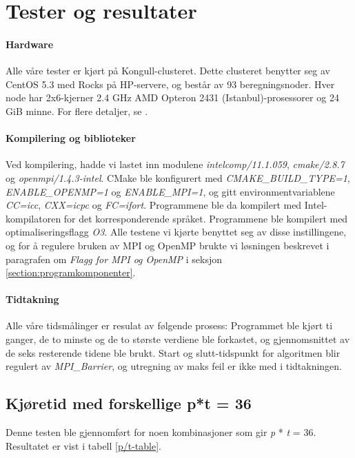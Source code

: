 \documentclass{article}
\begin{document}
\section{Tester og resultater}

\paragraph{Hardware}
Alle våre tester er kjørt på Kongull-clusteret. Dette clusteret benytter seg av CentOS 5.3 med Rocks på HP-servere, og består av 93 beregningsnoder. Hver node har 2x6-kjerner 2.4 GHz AMD Opteron 2431 (Istanbul)-prosessorer og 24 GiB minne. For flere detaljer, se \cite{kongull-hardware}.  

\paragraph{Kompilering og biblioteker}
Ved kompilering, hadde vi lastet inn modulene \emph{intelcomp/11.1.059}, \emph{cmake/2.8.7} og \emph{openmpi/1.4.3-intel}. CMake ble konfigurert med \emph{CMAKE\_BUILD\_TYPE=1}, \emph{ENABLE\_OPENMP=1} og \emph{ENABLE\_MPI=1}, og gitt environmentvariablene \emph{CC=icc}, \emph{CXX=icpc} og \emph{FC=ifort}. Programmene ble da kompilert med Intel-kompilatoren for det korresponderende språket. Programmene ble kompilert med optimaliseringsflagg \emph{O3}. Alle testene vi kjørte benyttet seg av disse instillingene, og for å regulere bruken av MPI og OpenMP brukte vi løsningen beskrevet i paragrafen om \emph{Flagg for MPI og OpenMP} i seksjon \ref{section:programkomponenter}.

\paragraph{Tidtakning}
Alle våre tidsmålinger er resulat av følgende prosess: Programmet ble kjørt ti ganger, de to minste og de to største verdiene ble forkastet, og gjennomsnittet av de seks resterende tidene ble brukt. Start og slutt-tidspunkt for algoritmen blir regulert av \emph{MPI\_Barrier}, og utregning av maks feil er ikke med i tidtakningen.



\subsection{Kjøretid med forskellige p*t = 36}
\label{subsection:runtime}
Denne testen ble gjennomført for noen kombinasjoner som gir \emph{p} * \emph{t} = 36. Resultatet er vist i tabell \ref{p/t-table}.
\end{document}
